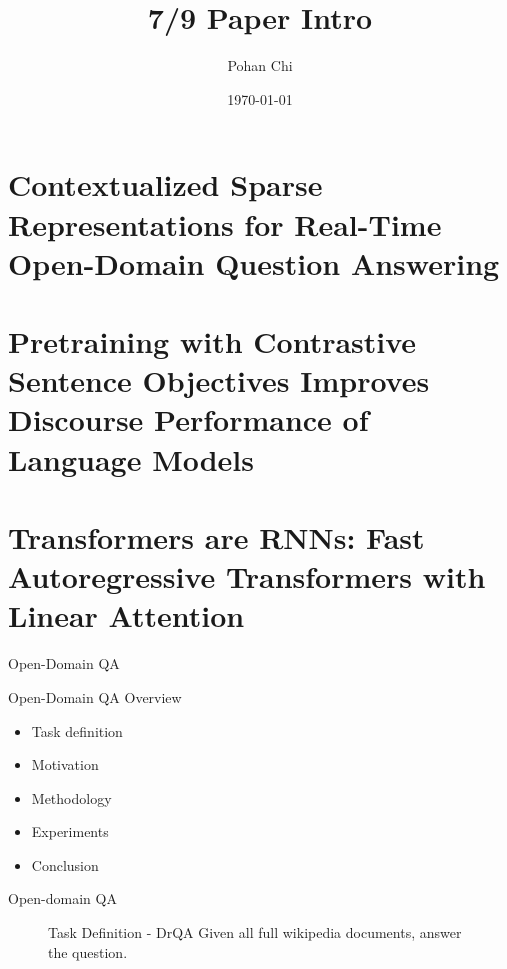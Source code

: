 \documentclass[10pt]{beamer}
\title{7/9 Paper Intro}
\subtitle{}
\author{Pohan Chi}
\date{\today}
\begin{document}
\maketitle

\maketoc

\section{Contextualized Sparse Representations for
Real-Time Open-Domain Question Answering}

\section{Pretraining with Contrastive Sentence Objectives Improves Discourse Performance of Language Models}

\section{Transformers are RNNs: Fast Autoregressive Transformers with Linear Attention}

\begin{frame}{Open-Domain QA}
    \begin{figure}
        \begin{center}
        \end{center}
    \end{figure}
    \begin{center}
    \end{center}
\end{frame}

\begin{frame}{Open-Domain QA}
   Overview
   \begin{itemize}
    \item Task definition
    \item Motivation
    \item Methodology
    \item Experiments
    \item Conclusion
   \end{itemize}
\end{frame}

\begin{frame}{Open-domain QA}
    \begin{figure}
        \begin{center}
            Task Definition - DrQA
            \vfill
            \vfill
            Given all full wikipedia documents, answer the question.
        \end{center}
    \end{figure}
\end{frame}
\end{document}
